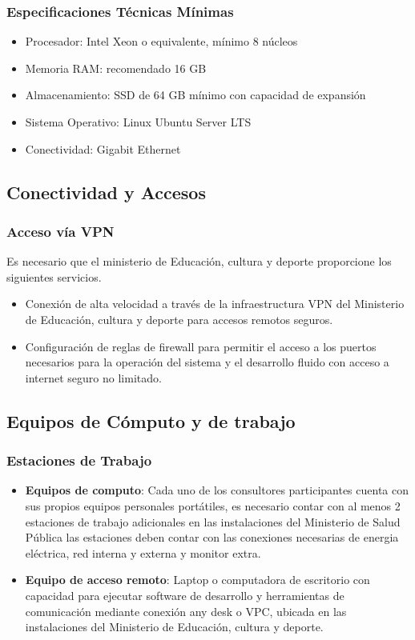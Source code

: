 \subsubsection{Especificaciones Técnicas Mínimas}
\begin{itemize}
    \item Procesador: Intel Xeon o equivalente, mínimo 8 núcleos
    \item Memoria RAM: recomendado 16 GB
    \item Almacenamiento: SSD de 64 GB mínimo con capacidad de expansión
    \item Sistema Operativo: Linux Ubuntu Server LTS
    \item Conectividad: Gigabit Ethernet
\end{itemize}

\subsection{Conectividad y Accesos}
\subsubsection{Acceso vía VPN}
Es necesario que el ministerio de Educación, cultura y deporte proporcione los siguientes servicios.
\begin{itemize}
    \item Conexión de alta velocidad a través de la infraestructura VPN del Ministerio de Educación, cultura y deporte para accesos remotos seguros.
    \item Configuración de reglas de firewall para permitir el acceso a los puertos necesarios para la operación del sistema y el desarrollo fluido con acceso a internet seguro no limitado.
\end{itemize}

\subsection{Equipos de Cómputo y de trabajo}

\subsubsection{Estaciones de Trabajo}
\begin{itemize}
    \item \textbf{Equipos de computo}: 
    Cada uno de los consultores participantes cuenta con sus propios equipos personales portátiles, es necesario contar con al menos 2 estaciones de trabajo adicionales en las instalaciones del Ministerio de Salud Pública las estaciones deben contar con las conexiones necesarias de energia eléctrica, red interna y externa y monitor extra.
    \item \textbf{Equipo de acceso remoto}: Laptop o computadora de escritorio con capacidad para ejecutar software de desarrollo y herramientas de comunicación mediante conexión any desk o VPC, ubicada en las instalaciones del Ministerio de Educación, cultura y deporte.
\end{itemize}

